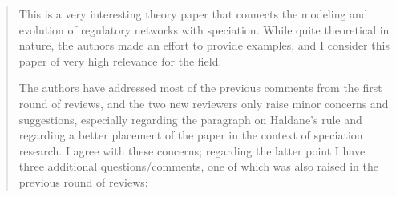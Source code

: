 
% 
% 
% 
%
%
%
%
% 
%
%
%
%
%
%
%
\begin{quote}
This is a very interesting theory paper that connects the modeling and evolution of regulatory networks with speciation. While quite theoretical in nature, the authors made an effort to provide examples, and I consider this paper of very high relevance for the field.

The authors have addressed most of the previous comments from the first round of reviews, and the two new reviewers only raise minor concerns and suggestions, especially regarding the paragraph on Haldane’s rule and regarding a better placement of the paper in the context of speciation research. I agree with these concerns; regarding the latter point I have three additional questions/comments, one of which was also raised in the previous round of reviews:
\end{quote}

